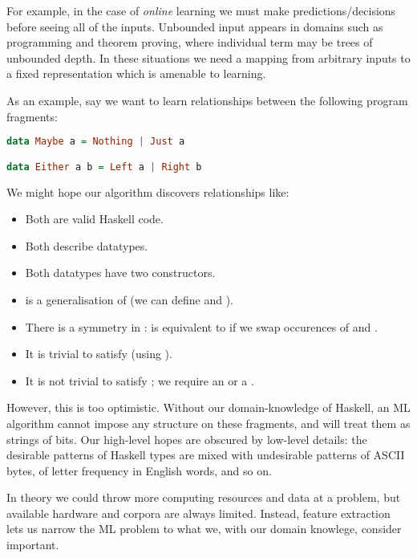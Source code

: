 For example, in the case of \emph{online} learning we must make
predictions/decisions before seeing all of the inputs. Unbounded input appears
in domains such as programming and theorem proving, where individual term may be
trees of unbounded depth. In these situations we need a mapping from arbitrary
inputs to a fixed representation which is amenable to learning.

As an example, say we want to learn relationships between the following program
fragments:

\begin{lstlisting}[language=Haskell, xleftmargin=.2\textwidth, xrightmargin=.2\textwidth]
data Maybe a = Nothing | Just a

data Either a b = Left a | Right b
\end{lstlisting}

We might hope our algorithm discovers relationships like:

\begin{itemize}
  \item Both are valid Haskell code.
  \item Both describe datatypes.
  \item Both datatypes have two constructors.
  \item {} is a generalisation of  (we can define  and ).
  \item There is a symmetry in :  is equivalent to
     if we swap occurences of  and .
  \item It is trivial to satisfy  (using ).
  \item It is not trivial to satisfy ; we require an  or a .
\end{itemize}

However, this is too optimistic. Without our domain-knowledge of Haskell, an ML
algorithm cannot impose any structure on these fragments, and will treat them as
strings of bits. Our high-level hopes are obscured by low-level details: the
desirable patterns of Haskell types are mixed with undesirable patterns of ASCII
bytes, of letter frequency in English words, and so on.

In theory we could throw more computing resources and data at a problem, but
available hardware and corpora are always limited. Instead, feature extraction
lets us narrow the ML problem to what we, with our domain knowlege, consider
important.

